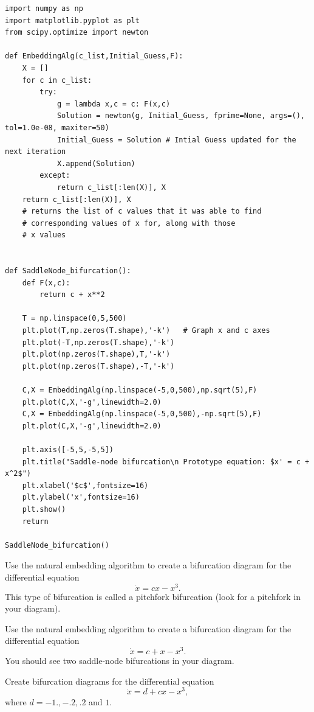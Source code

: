 \begin{lstlisting}
import numpy as np
import matplotlib.pyplot as plt
from scipy.optimize import newton

def EmbeddingAlg(c_list,Initial_Guess,F):
	X = []
	for c in c_list:
		try:
			g = lambda x,c = c: F(x,c)
			Solution = newton(g, Initial_Guess, fprime=None, args=(), tol=1.0e-08, maxiter=50)
			Initial_Guess = Solution # Intial Guess updated for the next iteration
			X.append(Solution)
		except:
			return c_list[:len(X)], X	
	return c_list[:len(X)], X   		
	# returns the list of c values that it was able to find  
	# corresponding values of x for, along with those 					
	# x values
	
	
def SaddleNode_bifurcation():
	def F(x,c):
		return c + x**2
	
	T = np.linspace(0,5,500)
	plt.plot(T,np.zeros(T.shape),'-k')   # Graph x and c axes
	plt.plot(-T,np.zeros(T.shape),'-k')
	plt.plot(np.zeros(T.shape),T,'-k')
	plt.plot(np.zeros(T.shape),-T,'-k')
	
	C,X = EmbeddingAlg(np.linspace(-5,0,500),np.sqrt(5),F)
	plt.plot(C,X,'-g',linewidth=2.0)
	C,X = EmbeddingAlg(np.linspace(-5,0,500),-np.sqrt(5),F)
	plt.plot(C,X,'-g',linewidth=2.0)
	
	plt.axis([-5,5,-5,5])
	plt.title("Saddle-node bifurcation\n Prototype equation: $x' = c + x^2$")
	plt.xlabel('$c$',fontsize=16)
	plt.ylabel('x',fontsize=16)
	plt.show()
	return

SaddleNode_bifurcation()

\end{lstlisting}
% 

% 
\begin{problem}
Use the natural embedding algorithm to create a bifurcation diagram for the differential equation
\[\dot{x} = cx-x^3.\]
This type of bifurcation is called a pitchfork bifurcation (look for a pitchfork in your diagram).
\end{problem}

\begin{problem}
Use the natural embedding algorithm to create a bifurcation diagram for the differential equation
	\[\dot{x} = c + x - x^3.\]
You should see two saddle-node bifurcations in your diagram. 
\end{problem}

\begin{problem}
Create bifurcation diagrams for the differential equation
\[\dot{x} = d + cx-x^3,\]
where $d = -1., -.2, .2$ and $1.$

\end{problem}



%
%
